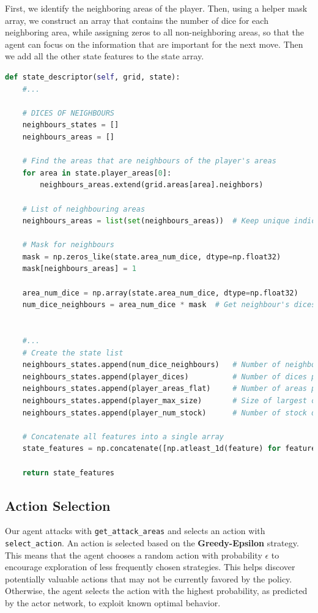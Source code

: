 \documentclass{article}
\begin{document}
First, we identify the neighboring areas of the player. Then, using a helper mask array, we construct an array that contains the number of dice for each neighboring area, while assigning zeros to all non-neighboring areas, so that the agent can focus on the information that are important for the next move. Then we add all the other state features to the state array.
\\
\begin{lstlisting}[language=Python, caption={State Descriptor}, label={lst:descriptor}]
def state_descriptor(self, grid, state):
    #...

    # DICES OF NEIGHBOURS
    neighbours_states = []
    neighbours_areas = []

    # Find the areas that are neighbours of the player's areas
    for area in state.player_areas[0]:
        neighbours_areas.extend(grid.areas[area].neighbors)

    # List of neighbouring areas
    neighbours_areas = list(set(neighbours_areas))  # Keep unique indices

    # Mask for neighbours
    mask = np.zeros_like(state.area_num_dice, dtype=np.float32)
    mask[neighbours_areas] = 1

    area_num_dice = np.array(state.area_num_dice, dtype=np.float32)
    num_dice_neighbours = area_num_dice * mask  # Get neighbour's dices


    #...      
    # Create the state list
    neighbours_states.append(num_dice_neighbours)   # Number of neighbour's dices ---> Length = 30
    neighbours_states.append(player_dices)          # Number of dices per player ---> Length = 4
    neighbours_states.append(player_areas_flat)     # Number of areas per player ---> Length = 4
    neighbours_states.append(player_max_size)       # Size of largest cluster per player ---> Length = 4
    neighbours_states.append(player_num_stock)      # Number of stock dices per player ---> Length = 4

    # Concatenate all features into a single array
    state_features = np.concatenate([np.atleast_1d(feature) for feature in neighbours_states]).astype(np.float32)

    return state_features
\end{lstlisting}

\subsection{Action Selection}
Our agent attacks with \texttt{get\_attack\_areas} and selects an action with \texttt{select\_action}. An action is selected based on the \textbf{Greedy-Epsilon} strategy. This means that the agent chooses a random action with probability $\epsilon$ to encourage exploration of less frequently chosen strategies. This helps discover potentially valuable actions that may not be currently favored by the policy. Otherwise, the agent selects the action with the highest probability, as predicted by the actor network, to exploit known optimal behavior. 
\end{document}
